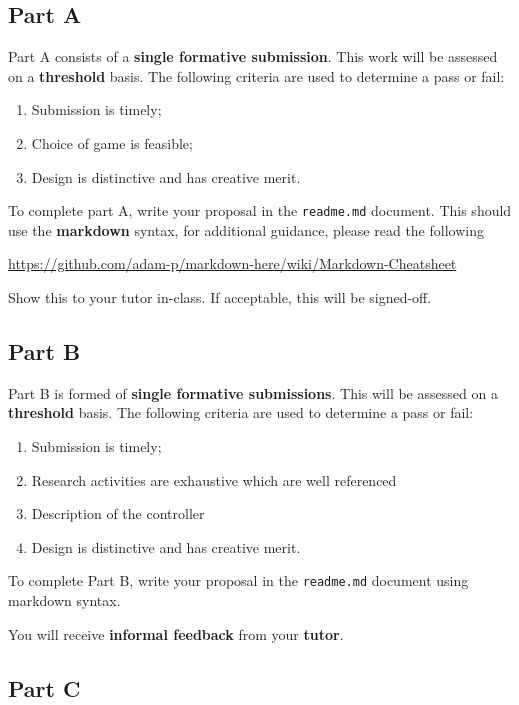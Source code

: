 \documentclass{../fal_assignment}
\begin{document}
	\subsection*{Part A}
	
	Part A consists of a \textbf{single formative submission}. This work will be assessed on a \textbf{threshold} basis. The following criteria are used to determine a pass or fail:
	
	\begin{enumerate}[label=(\alph*)]
		\item Submission is timely;
		\item Choice of game is feasible;
		\item Design is distinctive and has creative merit.
	\end{enumerate}
	
	To complete part A, write your proposal in the \texttt{readme.md} document. This should use the \textbf{markdown} syntax, for additional guidance, please read the following  
	
	\indent \url{https://github.com/adam-p/markdown-here/wiki/Markdown-Cheatsheet}
	
	Show this to your tutor in-class. If acceptable, this will be signed-off.
	
	\subsection*{Part B}
	
	Part B is formed of \textbf{single formative submissions}. This will be assessed on a \textbf{threshold} basis. The following criteria are used to determine a pass or fail:
	
	\begin{enumerate}[label=(\alph*)]
		\item Submission is timely;
		\item Research activities are exhaustive which are well referenced
		\item Description of the controller 
		\item Design is distinctive and has creative merit.
	\end{enumerate}
	
	To complete Part B, write your proposal in the \texttt{readme.md} document using markdown syntax.
	
	You will receive \textbf{informal feedback} from your \textbf{tutor}.
	
	\subsection*{Part C}
	
\end{document}
